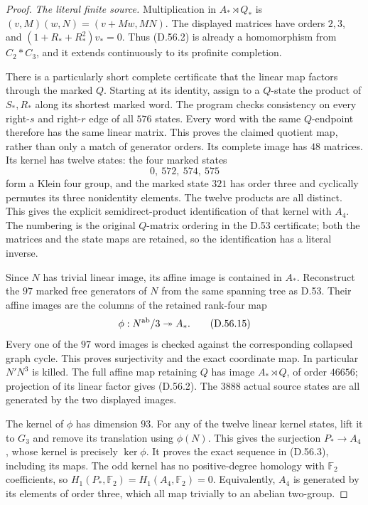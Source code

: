 \begin{proof}
\emph{The literal finite source.}
Multiplication in \(A_*\rtimes Q_*\) is
\((v,M)(w,N)=(v+Mw,MN)\).
The displayed matrices have orders \(2,3\), and
\((1+R_*+R_*^2)v_*=0\).
Thus (D.56.2) is already a homomorphism from
\(C_2*C_3\), and it extends continuously to its
profinite completion.

There is a particularly short complete certificate that the
linear map factors through the marked \(Q\).
Starting at its identity, assign to a \(Q\)-state the product
of \(S_*,R_*\) along its shortest marked word.
The program checks consistency on every right-\(s\) and
right-\(r\) edge of all \(576\) states.
Every word with the same \(Q\)-endpoint therefore has the
same linear matrix. This proves the claimed quotient map,
rather than only a match of generator orders.
Its complete image has \(48\) matrices. Its kernel has
twelve states: the four marked states
\[
            0,\ 572,\ 574,\ 575
 \tag{D.56.14}
\]
form a Klein four group, and the marked state \(321\)
has order three and cyclically permutes its three nonidentity
elements. The twelve products are all distinct.
This gives the explicit semidirect-product identification
of that kernel with \(A_4\).
The numbering is the original \(Q\)-matrix ordering in
the D.53 certificate; both the matrices and the state maps
are retained, so the identification has a literal inverse.

Since \(N\) has trivial linear image, its affine image is
contained in \(A_*\). Reconstruct the \(97\) marked free
generators of \(N\) from the same spanning tree as D.53.
Their affine images are the columns of the retained
rank-four map
\[
         \phi:N^{\rm ab}/3\twoheadrightarrow A_* .
 \tag{D.56.15}
\]
Every one of the \(97\) word images is checked against
the corresponding collapsed graph cycle. This proves
surjectivity and the exact coordinate map.
In particular \(N'N^3\) is killed. The full affine map
retaining \(Q\) has image \(A_*\rtimes Q\), of order
\(46656\); projection of its linear factor gives (D.56.2).
The \(3888\) actual source states are all generated by
the two displayed images.

The kernel of \(\phi\) has dimension \(93\).
For any of the twelve linear kernel states, lift it to
\(G_3\) and remove its translation using \(\phi(N)\).
This gives the surjection \(P_*\to A_4\), whose kernel
is precisely \(\ker\phi\). It proves the exact sequence
in (D.56.3), including its maps.
The odd kernel has no positive-degree homology with
\(\mathbb F_2\) coefficients, so
\(H_1(P_*,\mathbb F_2)=H_1(A_4,\mathbb F_2)=0\).
Equivalently, \(A_4\) is generated by its elements of
order three, which all map trivially to an abelian
two-group.


\end{proof}
